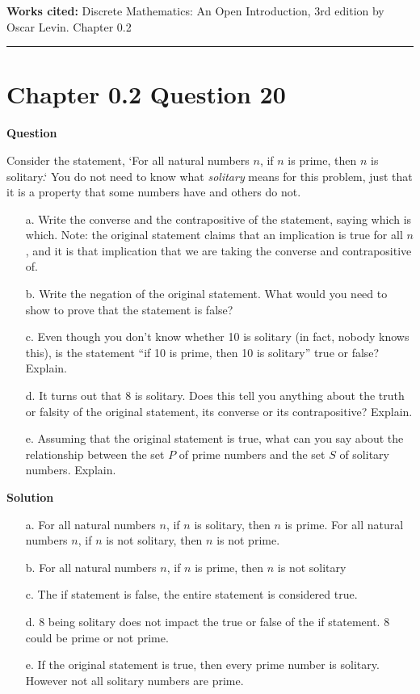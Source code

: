 \documentclass{article}
\begin{document}
\vspace{0.5cm}
\textbf{Works cited:}
Discrete Mathematics: An Open Introduction, 3rd edition by Oscar Levin. Chapter 0.2

\vspace{0.5cm}
\hrule
\vspace{0.5cm}

\section*{Chapter 0.2 Question 20} 

\textbf{Question}

Consider the statement, `For all natural numbers $n$, if $n$ is prime, then $n$ is solitary.` You do not need to know what \textit{solitary} means for this problem, just that it is a property that some numbers have and others do not.

\begin{enumerate}
\item[a.] Write the converse and the contrapositive of the statement, saying which is which. Note: the original statement claims that an implication is true for all $n$, and it is that implication that we are taking the converse and contrapositive of.

\item[b.] Write the negation of the original statement. What would you need to show to prove that the statement is false?

\item[c.] Even though you don't know whether 10 is solitary (in fact, nobody knows this), is the statement “if 10 is prime, then 10 is solitary” true or false? Explain.

\item[d.] It turns out that 8 is solitary. Does this tell you anything about the truth or falsity of the original statement, its converse or its contrapositive? Explain.

\item[e.] Assuming that the original statement is true, what can you say about the relationship between the set $P$ of prime numbers and the set $S$ of solitary numbers. Explain.
\end{enumerate}

\textbf{Solution}

\begin{enumerate}
    \item[a.] For all natural numbers $n$, if $n$ is solitary, then $n$ is prime. For all natural numbers $n$, if $n$ is not solitary, then $n$ is not prime.
    \item[b.] For all natural numbers $n$, if $n$ is prime, then $n$ is not solitary
    \item[c.] The if statement is false, the entire statement is considered true.
    \item[d.] 8 being solitary does not impact the true or false of the if statement. 8 could be prime or not prime.
    \item[e.] If the original statement is true, then every prime number is solitary. However not all solitary numbers are prime.
\end{enumerate}
\end{document}
